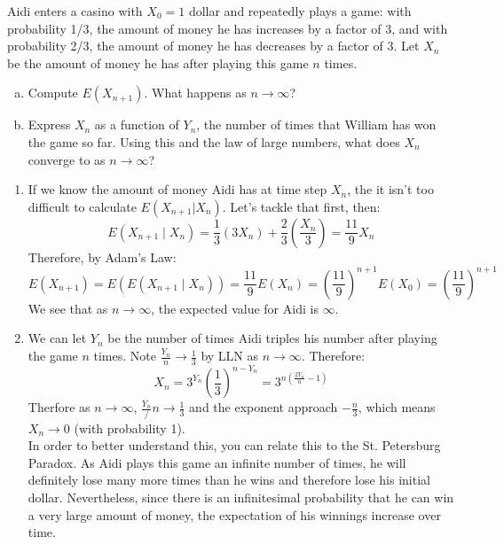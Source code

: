 \documentclass[11pt]{article}
\begin{document}
{\begin{exercise}
Aidi enters a casino with $X_0 = 1$ dollar and repeatedly plays a game: with probability 1/3, the amount of money he has increases by a factor of 3, and with probability 2/3, the amount of money he has decreases by a factor of 3. Let $X_n$ be the amount of money he has after playing this game $n$ times.
\begin{enumerate}[a)]
  \item Compute $E(X_{n+1})$. What happens as $n\rightarrow \infty$?
  \item Express $X_n$ as a function of $Y_n$, the number of times that William has won the game so far. Using this and the law of large numbers, what does $X_n$ converge to as $n\rightarrow \infty$?
\end{enumerate}
\end{exercise}

\begin{solution}
\begin{enumerate}
\item If we know the amount of money Aidi has at time step $X_n$, the it isn't too difficult to calculate $E(X_{n+1} | X_n)$. Let's tackle that first, then:
$$
E(X_{n+1} \mid X_n) = \frac{1}{3}(3X_n) + \frac{2}{3}(\frac{X_n}{3}) = \frac{11}{9}X_n
$$
Therefore, by Adam's Law:
$$
E(X_{n+1}) = E(E(X_{n+1} \mid X_n)) = \frac{11}{9}E(X_n) = \left(\frac{11}{9}\right)^{n+1}E(X_0) = \left(\frac{11}{9}\right)^{n+1}
$$
We see that as $n \to \infty$, the expected value for Aidi is $\infty$.
\item We can let $Y_n$ be the number of times Aidi triples his number after playing the game $n$ times. Note $\frac{Y_n}{n} \to \frac{1}{3}$ by LLN as $n \to \infty$. Therefore:
$$
X_n = 3^{Y_n}\left(\frac{1}{3}\right)^{n - Y_n} = 3^{n(\frac{2Y_n}{n} - 1)}
$$
Therfore as $n \to \infty$, $\frac{Y_n}/n \to \frac{1}{3}$ and the exponent approach $-\frac{n}{3}$, which means $X_n \to 0$ (with probability 1).\\

In order to better understand this, you can relate this to the St. Petersburg Paradox. As Aidi plays this game an infinite number of times, he will definitely lose many more times than he wins and therefore lose his initial dollar. Nevertheless, since there is an infinitesimal probability that he can win a very large amount of money, the expectation of his winnings increase over time.
\end{enumerate}
\end{solution}


}
\end{document}
